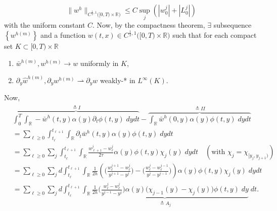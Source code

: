 \documentclass[a4paper,11pt]{article}
\def\red{\color{red}}
\theoremstyle{remark}
\begin{document}
{\red
$$ \| w^h\|_{C^{\frac{1}{2},1}\big([0,T)\times \mathbb{R}\big)} \le C\sup _{j}\left(|w^j_0|+|L^j_0|\right)$$
with the uniform constant $C$. Now, by the compactness theorem, 
 $\exists$ subsequence $\left\{w^{h(m)}\right\}$ and a function $w(t,x)\in C^{\frac{1}{2},1}\big([0,T)\times \mathbb{R}\big)$ such that for each compact set $K \subset [0,T)\times \mathbb{R}$
 \begin{enumerate}
  \item $\bar{w}^{h(m)}, w^{h(m)}\rightarrow w$ uniformly in $K$,
  \item $\partial_y \hat{w}^{h(m)}, \partial_y w^{h(m)} \rightharpoonup \partial_y w$ weakly-* in $L^\infty(K)$.
 \end{enumerate}
}

Now,
\begin{align*}
 &\overbrace{\int_0^T\int_\mathbb{R} -\bar w^h(t,y) \alpha(y)\partial_t\phi(t,y)\; dy dt}^{\triangleq I} -\overbrace{\int_\mathbb{R} \bar{w}^h(0,y)\alpha(y)\phi(t,y) \; dydt}^{\triangleq II} \\
 &=\sum_{\ell\ge0}\int_{t_\ell}^{t_{\ell+1}}\int_\mathbb{R} \partial_t\bar w^h(t,y) \alpha(y)\phi(t,y)\; dy dt \\
 &=\sum_{\ell\ge0}\sum_{j}\int_{t_\ell}^{t_{\ell+1}}\int_\mathbb{R} \frac{w^j_{\ell+1}-w^j_{\ell}}{2\tau} \alpha(y)\phi(t,y)\chi_j(y)\; dy dt \quad (\text{with } \chi_j=\chi_{[y_j,y_{j+1})})\\
 &=\sum_{\ell\ge0}\sum_{j}d\int_{t_\ell}^{t_{\ell+1}}\int_\mathbb{R} \tfrac{1}{2h} \left( \Big(\tfrac{w^{j+1}_{\ell} - w^{j}_{\ell}}{y^{j+1}-y^j}\Big) -\Big(\tfrac{w^{j}_{\ell} - w^{j-1}_{\ell}}{y^{j}-y^{j-1}} \Big)\right) \alpha(y)\phi(t,y)\chi_j(y)\; dy dt\\
 &=\sum_{\ell\ge0}\sum_{j}d\int_{t_\ell}^{t_{\ell+1}}\underbrace{\int_\mathbb{R} \tfrac{1}{2h} \Big(\tfrac{w^{j}_{\ell} - w^{j}_{\ell}}{y^{j-1}-y^j}\Big)\alpha(y)\big(\chi_{j-1}(y)-\chi_{j}(y)\big) \phi(t,y)\; dy}_{\triangleq A_j} \;dt.
\end{align*}
\end{document}
